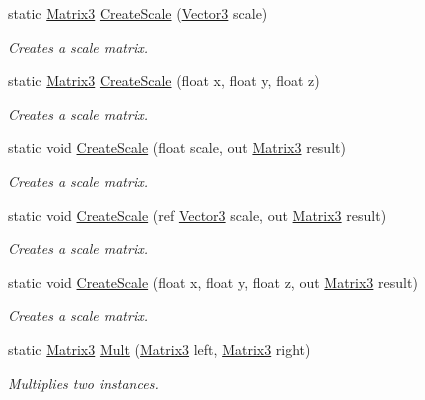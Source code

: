 \begin{DoxyCompactItemize}
static \hyperlink{struct_open_t_k_1_1_matrix3}{Matrix3} \hyperlink{struct_open_t_k_1_1_matrix3_a44eff58613483dfa2367355ee330d161}{Create\-Scale} (\hyperlink{struct_open_t_k_1_1_vector3}{Vector3} scale)
\begin{DoxyCompactList}\small\item\em Creates a scale matrix. \end{DoxyCompactList}\item 
static \hyperlink{struct_open_t_k_1_1_matrix3}{Matrix3} \hyperlink{struct_open_t_k_1_1_matrix3_affd28d053d3c0b99dbeb5745f440ad73}{Create\-Scale} (float x, float y, float z)
\begin{DoxyCompactList}\small\item\em Creates a scale matrix. \end{DoxyCompactList}\item 
static void \hyperlink{struct_open_t_k_1_1_matrix3_abffdf4735668fbb640d571a3eefd83a8}{Create\-Scale} (float scale, out \hyperlink{struct_open_t_k_1_1_matrix3}{Matrix3} result)
\begin{DoxyCompactList}\small\item\em Creates a scale matrix. \end{DoxyCompactList}\item 
static void \hyperlink{struct_open_t_k_1_1_matrix3_aa3d04a7c68c8269b5f41493627ac07bf}{Create\-Scale} (ref \hyperlink{struct_open_t_k_1_1_vector3}{Vector3} scale, out \hyperlink{struct_open_t_k_1_1_matrix3}{Matrix3} result)
\begin{DoxyCompactList}\small\item\em Creates a scale matrix. \end{DoxyCompactList}\item 
static void \hyperlink{struct_open_t_k_1_1_matrix3_aeea9a7c5387f138d020be4b211e84f01}{Create\-Scale} (float x, float y, float z, out \hyperlink{struct_open_t_k_1_1_matrix3}{Matrix3} result)
\begin{DoxyCompactList}\small\item\em Creates a scale matrix. \end{DoxyCompactList}\item 
static \hyperlink{struct_open_t_k_1_1_matrix3}{Matrix3} \hyperlink{struct_open_t_k_1_1_matrix3_ad997db0af3a3e31a309f8833ba1f869a}{Mult} (\hyperlink{struct_open_t_k_1_1_matrix3}{Matrix3} left, \hyperlink{struct_open_t_k_1_1_matrix3}{Matrix3} right)
\begin{DoxyCompactList}\small\item\em Multiplies two instances. \end{DoxyCompactList}\item 

\end{DoxyCompactItemize}
